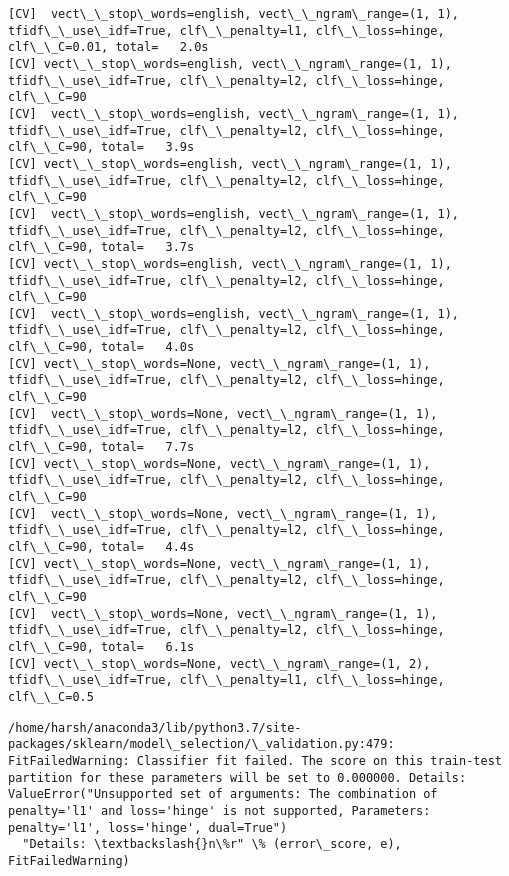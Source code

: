 \documentclass[11pt]{article}
\begin{document}
    \begin{Verbatim}[commandchars=\\\{\}]
[CV]  vect\_\_stop\_words=english, vect\_\_ngram\_range=(1, 1), tfidf\_\_use\_idf=True, clf\_\_penalty=l1, clf\_\_loss=hinge, clf\_\_C=0.01, total=   2.0s
[CV] vect\_\_stop\_words=english, vect\_\_ngram\_range=(1, 1), tfidf\_\_use\_idf=True, clf\_\_penalty=l2, clf\_\_loss=hinge, clf\_\_C=90 
[CV]  vect\_\_stop\_words=english, vect\_\_ngram\_range=(1, 1), tfidf\_\_use\_idf=True, clf\_\_penalty=l2, clf\_\_loss=hinge, clf\_\_C=90, total=   3.9s
[CV] vect\_\_stop\_words=english, vect\_\_ngram\_range=(1, 1), tfidf\_\_use\_idf=True, clf\_\_penalty=l2, clf\_\_loss=hinge, clf\_\_C=90 
[CV]  vect\_\_stop\_words=english, vect\_\_ngram\_range=(1, 1), tfidf\_\_use\_idf=True, clf\_\_penalty=l2, clf\_\_loss=hinge, clf\_\_C=90, total=   3.7s
[CV] vect\_\_stop\_words=english, vect\_\_ngram\_range=(1, 1), tfidf\_\_use\_idf=True, clf\_\_penalty=l2, clf\_\_loss=hinge, clf\_\_C=90 
[CV]  vect\_\_stop\_words=english, vect\_\_ngram\_range=(1, 1), tfidf\_\_use\_idf=True, clf\_\_penalty=l2, clf\_\_loss=hinge, clf\_\_C=90, total=   4.0s
[CV] vect\_\_stop\_words=None, vect\_\_ngram\_range=(1, 1), tfidf\_\_use\_idf=True, clf\_\_penalty=l2, clf\_\_loss=hinge, clf\_\_C=90 
[CV]  vect\_\_stop\_words=None, vect\_\_ngram\_range=(1, 1), tfidf\_\_use\_idf=True, clf\_\_penalty=l2, clf\_\_loss=hinge, clf\_\_C=90, total=   7.7s
[CV] vect\_\_stop\_words=None, vect\_\_ngram\_range=(1, 1), tfidf\_\_use\_idf=True, clf\_\_penalty=l2, clf\_\_loss=hinge, clf\_\_C=90 
[CV]  vect\_\_stop\_words=None, vect\_\_ngram\_range=(1, 1), tfidf\_\_use\_idf=True, clf\_\_penalty=l2, clf\_\_loss=hinge, clf\_\_C=90, total=   4.4s
[CV] vect\_\_stop\_words=None, vect\_\_ngram\_range=(1, 1), tfidf\_\_use\_idf=True, clf\_\_penalty=l2, clf\_\_loss=hinge, clf\_\_C=90 
[CV]  vect\_\_stop\_words=None, vect\_\_ngram\_range=(1, 1), tfidf\_\_use\_idf=True, clf\_\_penalty=l2, clf\_\_loss=hinge, clf\_\_C=90, total=   6.1s
[CV] vect\_\_stop\_words=None, vect\_\_ngram\_range=(1, 2), tfidf\_\_use\_idf=True, clf\_\_penalty=l1, clf\_\_loss=hinge, clf\_\_C=0.5 

    \end{Verbatim}

    \begin{Verbatim}[commandchars=\\\{\}]
/home/harsh/anaconda3/lib/python3.7/site-packages/sklearn/model\_selection/\_validation.py:479: FitFailedWarning: Classifier fit failed. The score on this train-test partition for these parameters will be set to 0.000000. Details: 
ValueError("Unsupported set of arguments: The combination of penalty='l1' and loss='hinge' is not supported, Parameters: penalty='l1', loss='hinge', dual=True")
  "Details: \textbackslash{}n\%r" \% (error\_score, e), FitFailedWarning)

    \end{Verbatim}
\end{document}
